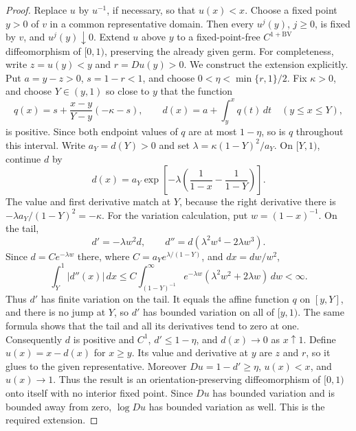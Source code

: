 \documentclass[11pt]{article}
\theoremstyle{definition}
\theoremstyle{remark}
\begin{document}
\begin{proof}
Replace \(u\) by \(u^{-1}\), if necessary, so that \(u(x)<x\).  Choose a
fixed point \(y>0\) of \(v\) in a common representative domain.  Then every
\(u^j(y)\), \(j\geq0\), is fixed by \(v\), and \(u^j(y)\downarrow0\).
Extend \(u\) above \(y\) to a fixed-point-free
\(C^{1+\mathrm{BV}}\) diffeomorphism of \([0,1)\), preserving the already
given germ.  For completeness, write \(z=u(y)<y\) and \(r=Du(y)>0\).
We construct the extension explicitly.  Put \(a=y-z>0\),
\(s=1-r<1\), and choose
\(0<\eta<\min\{r,1\}/2\).  Fix \(\kappa>0\), and choose
\(Y\in(y,1)\) so close to \(y\) that the function
\[
 q(x)=s+\frac{x-y}{Y-y}(-\kappa-s),\qquad
 d(x)=a+\int_y^x q(t)\,dt \quad (y\leq x\leq Y),
\]
is positive.  Since both endpoint values of \(q\) are at most
\(1-\eta\), so is \(q\) throughout this interval.  Write
\(a_Y=d(Y)>0\) and set
\(\lambda=\kappa(1-Y)^2/a_Y\).  On \([Y,1)\), continue \(d\) by
\[
 d(x)=a_Y\exp\!\left[-\lambda
   \left(\frac1{1-x}-\frac1{1-Y}\right)\right].
\]
The value and first derivative match at \(Y\), because the right derivative
there is \(-\lambda a_Y/(1-Y)^2=-\kappa\).  For the variation calculation,
put \(w=(1-x)^{-1}\).  On the tail,
\[
 d'=-\lambda w^2d,\qquad
 d''=d(\lambda^2w^4-2\lambda w^3).
\]
Since \(d=C e^{-\lambda w}\) there, where
\(C=a_Ye^{\lambda/(1-Y)}\), and \(dx=dw/w^2\),
\[
 \int_Y^1|d''(x)|\,dx
 \leq C\int_{(1-Y)^{-1}}^\infty
 e^{-\lambda w}(\lambda^2w^2+2\lambda w)\,dw<\infty.
\]
Thus \(d'\) has finite variation on the tail.  It equals the affine
function \(q\) on \([y,Y]\), and there is no jump at \(Y\), so \(d'\) has
bounded variation on all of \([y,1)\).  The same formula shows that the tail
and all its derivatives tend to zero at one.  Consequently \(d\) is positive
and \(C^1\), \(d'\leq1-\eta\), and \(d(x)\to0\) as \(x\uparrow1\).  Define
\(u(x)=x-d(x)\) for \(x\geq y\).
Its value and derivative at \(y\) are \(z\) and \(r\), so it glues to the
given representative.  Moreover \(Du=1-d'\geq\eta\), \(u(x)<x\), and
\(u(x)\to1\).  Thus the result is an orientation-preserving diffeomorphism
of \([0,1)\) onto itself with no interior fixed point.  Since \(Du\) has
bounded variation and is bounded away from zero, \(\log Du\) has bounded
variation as well.  This is the required extension.


\end{proof}
\end{document}
